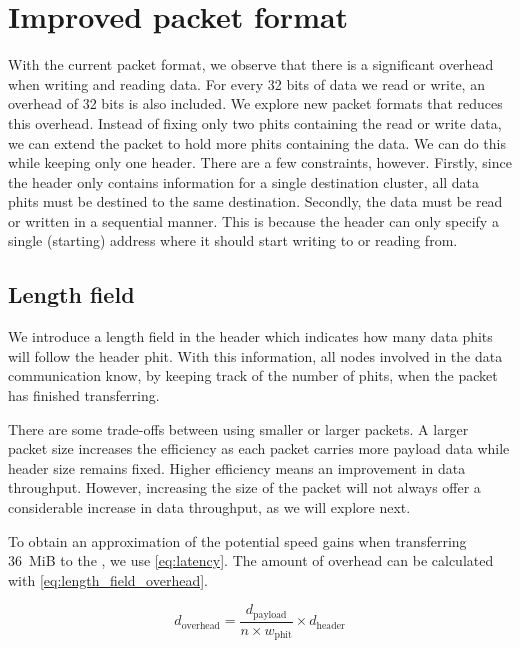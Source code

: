 \section{Improved packet format}
\label{section:improved_packet_format}
With the current packet format, we observe that there is a significant overhead when writing and reading data.
For every 32 bits of data we read or write, an overhead of 32 bits is also included.
We explore new packet formats that reduces this overhead.
Instead of fixing only two phits containing the read or write data, we can extend the packet to hold more phits containing the data.
We can do this while keeping only one header.
There are a few constraints, however.
Firstly, since the header only contains information for a single destination cluster, all data phits must be destined to the same destination.
Secondly, the data must be read or written in a sequential manner.
This is because the header can only specify a single (starting) address where it should start writing to or reading from.

\subsection{Length field}
We introduce a length field in the header which indicates how many data phits will follow the header phit.
With this information, all nodes involved in the data communication know, by keeping track of the number of phits, when the packet has finished transferring. 

There are some trade-offs between using smaller or larger packets.
A larger packet size increases the efficiency as each packet carries more payload data while header size remains fixed.
Higher efficiency means an improvement in data throughput.
However, increasing the size of the packet will not always offer a considerable increase in data throughput, as we will explore next.

To obtain an approximation of the potential speed gains when transferring \SI{36}{MiB} to the \graicore{}, we use \cref{eq:latency}.
The amount of overhead can be calculated with \cref{eq:length_field_overhead}.


\begin{equation}
    d_{\textrm{overhead}} = \frac{d_{\textrm{payload}}}{n \times w_\textrm{phit}} \times d_\textrm{header}
\label{eq:length_field_overhead}
\end{equation}

